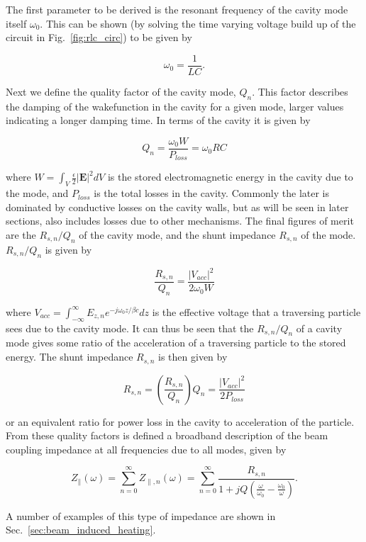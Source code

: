 The first parameter to be derived is the resonant frequency of the cavity mode itself $\omega_{0}$. This can be shown (by solving the time varying voltage build up of the circuit in Fig.~\ref{fig:rlc_circ}) to be given by

\begin{equation}
\omega_{0} = \frac{1}{LC}.
\end{equation}

Next we define the quality factor of the cavity mode, $Q_{n}$. This factor describes the damping of the wakefunction in the cavity for a given mode, larger values indicating a longer damping time. In terms of the cavity it is given by

\begin{equation}
Q_{n} = \frac{\omega_{0} W}{P_{loss}} = \omega_{0}RC
\end{equation}

where $W = \int_{V} \frac{\epsilon}{2} \left| \mathbf{E} \right|^{2} dV$ is the stored electromagnetic energy in the cavity due to the mode, and $P_{loss}$ is the total losses in the cavity. Commonly the later is dominated by conductive losses on the cavity walls, but as will be seen in later sections, also includes losses due to other mechanisms. The final figures of merit are the $R_{s, n}/Q_{n}$ of the cavity mode, and the shunt impedance $R_{s, n}$ of the mode. $R_{s, n}/Q_{n}$ is given by

\begin{equation}
\frac{R_{s, n}}{Q_{n}} = \frac{\left| V_{acc} \right|^{2}}{2 \omega_{0} W}
\end{equation}

where $V_{acc} = \int^{\infty}_{-\infty} E_{z, n} e^{-j \omega_{0} z/ \beta{}c} dz$ is the effective voltage that a traversing particle sees due to the cavity mode. It can thus be seen that the $R_{s, n}/Q_{n}$ of a cavity mode gives some ratio of the acceleration of a traversing particle to the stored energy. The shunt impedance $R_{s, n}$ is then given by

\begin{equation}
R_{s, n} = \left(  \frac{R_{s, n}}{Q_{n}} \right) Q_{n} = \frac{\left| V_{acc} \right|^{2}}{2 P_{loss}}
\end{equation}

or an equivalent ratio for power loss in the cavity to acceleration of the particle. From these quality factors is defined a broadband description of the beam coupling impedance at all frequencies due to all modes, given by

\begin{equation}
Z_{\parallel} \left( \omega \right) = \displaystyle\sum\limits_{n = 0}^{\infty} Z_{\parallel, n} \left( \omega \right) = \displaystyle\sum\limits_{n = 0}^{\infty} \frac{R_{s, n}}{1 + jQ \left( \frac{\omega}{\omega_{0}} - \frac{\omega_{0}}{\omega} \right)}.
\end{equation}

A number of examples of this type of impedance are shown in Sec.~\ref{sec:beam_induced_heating}.